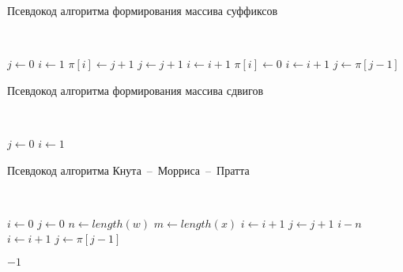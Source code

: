\begin{algorithm}[H]
	\caption{Псевдокод алгоритма формирования массива суффиксов}
	\label{alg:alg_01}
	\\
	\begin{algorithmic}[1]
		\State $j \gets 0$
		\State $i \gets 1$
				\State $\pi[i] \gets j + 1$
				\State $j \gets j + 1$
				\State $i \gets i + 1$
			\Else
					\State $\pi[i] \gets 0$
					\State $i \gets i + 1$
				\Else
					\State $j \gets \pi[j - 1]$
				\EndIf
			\EndIf
		\EndWhile
		\EndFunction
	\end{algorithmic}
\end{algorithm}

\begin{algorithm}[H]
	\caption{Псевдокод алгоритма формирования массива сдвигов}
	\label{alg:alg_02}
	\\
	\begin{algorithmic}[1]
		\State $j \gets 0$
		\State $i \gets 1$
		\EndFor
		\EndFunction
	\end{algorithmic}
\end{algorithm}

\begin{algorithm}[H]
	\caption{Псевдокод алгоритма  Кнута~--~Морриса~--~Пратта}
	\label{alg:alg_03}
	\\
	\begin{algorithmic}[1]
		\State $i \gets 0$
		\State $j \gets 0$
		\State $n \gets length(w)$
		\State $m \gets length(x)$
				\State $i \gets i + 1$
				\State $j \gets j + 1$
					\Return $i - n$
				\EndIf
			\Else
					\State $i \gets i + 1$
				\Else
					\State $j \gets \pi[j - 1]$
				\EndIf
			\EndIf
		\EndWhile
		
		\Return $-1$
		\EndFunction
	\end{algorithmic}
\end{algorithm}


